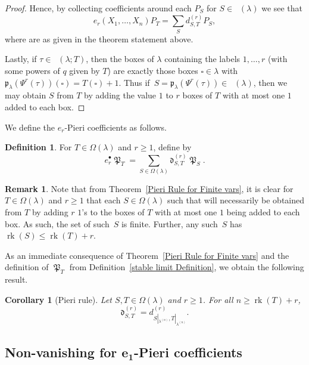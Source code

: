 \documentclass[10pt,a4paper]{amsart}
\numberwithin{equation}{section}
\newtheorem{Corollary}[Theorem]{Corollary}
\theoremstyle{definition}
\newtheorem{Definition}[Theorem]{Definition}
\newtheorem{Remark}[Theorem]{Remark}
\DeclareMathOperator{\PSYT}{\mathrm{PSYT}_{\geq 0}}
\DeclareMathOperator{\RSSYT}{\mathrm{RSSYT}_{\geq 0}}
\DeclareMathOperator{\MacD}{\mathfrak{P}}
\DeclareMathOperator{\rk}{\mathrm{rk}}
\begin{document}
\begin{proof}
 Hence, by collecting coefficients around each $P_S$ for $S \in \RSSYT(\lambda)$ we see that
 \[
 e_r(X_1,\dots, X_n)P_T = \sum_{S} d^{(r)}_{S,T} P_{S},
 \]
 where  are as given in the theorem statement above.

 Lastly, if $\tau \in \PSYT(\lambda;T)$, then the boxes of $\lambda$ containing the labels $1,\dots, r$ (with some powers of $q$ given by $T$) are exactly those boxes $\square \in \lambda$ with $\mathfrak{p}_{\lambda}(\Psi^r(\tau))(\square) = T(\square) +1$. Thus if~${S= \mathfrak{p}_{\lambda}(\Psi^r(\tau)) \in \RSSYT(\lambda)}$, then we may obtain $S$ from $T$ by adding the value $1$ to $r$ boxes of $T$ with at most one $1$ added to each box.
\end{proof}


We define the $e_r$-Pieri coefficients as follows.

\begin{Definition}\label{Pieri coeff Definition}
 For $T \in \Omega(\lambda)$ and $r \geq 1$, define  by
 \[
 e_r^{\bullet}\MacD_T = \sum_{S \in \Omega(\lambda)} \mathfrak{d}^{(r)}_{S,T} \MacD_{S}.
 \]

\end{Definition}

\begin{Remark}
 Note that from Theorem~\ref{Pieri Rule for Finite vars}, it is clear for $T \in \Omega(\lambda)$ and $ r\geq 1$ that each $S \in \Omega(\lambda)$ such that  will necessarily be obtained from $T$ by adding $r$ $1$'s to the boxes of $T$ with at most one $1$ being added to each box. As such, the set of such~$S$ is finite. Further, any such~$S$ has $\rk(S) \leq \rk(T) + r$.
\end{Remark}

As an immediate consequence of Theorem~\ref{Pieri Rule for Finite vars} and the definition of $\MacD_{T}$ from Definition~\ref{stable limit Definition}, we obtain the following result.

\begin{Corollary}[Pieri rule]\label{Pieri Rule}
 Let $S,T \in \Omega(\lambda)$ and $r \geq 1$. For all $n \geq \rk(T)+r$,
 \[
 \mathfrak{d}^{(r)}_{S,T} = d^{(r)}_{S|_{\lambda^{(n)}},T|_{\lambda^{(n)}}}.
 \]

\end{Corollary}


\subsection[Non-vanishing for e\_1-Pieri coefficients]{Non-vanishing for $\boldsymbol{e_1}$-Pieri coefficients}
\end{document}
